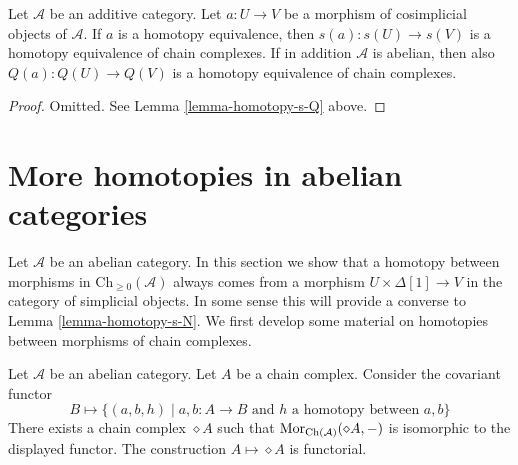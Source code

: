 \begin{lemma}
\label{lemma-homotopy-equivalence-s-Q}
Let $\mathcal{A}$ be an additive category. Let $a : U \to V$ be a morphism
of cosimplicial objects of $\mathcal{A}$. If $a$ is a homotopy equivalence,
then $s(a) : s(U) \to s(V)$ is a homotopy equivalence of chain complexes.
If in addition $\mathcal{A}$ is abelian, then also
$Q(a) : Q(U) \to Q(V)$ is a homotopy equivalence of chain complexes.
\end{lemma}

\begin{proof}
Omitted. See Lemma \ref{lemma-homotopy-s-Q} above.
\end{proof}




\section{More homotopies in abelian categories}
\label{section-backwards-homotopy}

\noindent
Let $\mathcal{A}$ be an abelian category.
In this section we show that a homotopy between
morphisms in $\text{Ch}_{\geq 0}(\mathcal{A})$
always comes from a morphism $U \times \Delta[1] \to V$
in the category of simplicial objects. In some sense
this will provide a converse to Lemma \ref{lemma-homotopy-s-N}.
We first develop some material on homotopies between morphisms
of chain complexes.

\begin{lemma}
\label{lemma-represent-homotopy}
Let $\mathcal{A}$ be an abelian category. Let $A$ be a chain complex.
Consider the covariant functor
$$
B \longmapsto
\{
(a, b, h)
\mid
a, b : A \to B\text{ and }h\text{ a homotopy between }a, b
\}
$$
There exists a chain complex $\diamond A$
such that $\mathop{\mathrm{Mor}}\nolimits_{\text{Ch}(\mathcal{A})}(\diamond A, -)$
is isomorphic to the displayed functor.
The construction $A \mapsto \diamond A$ is functorial.
\end{lemma}

